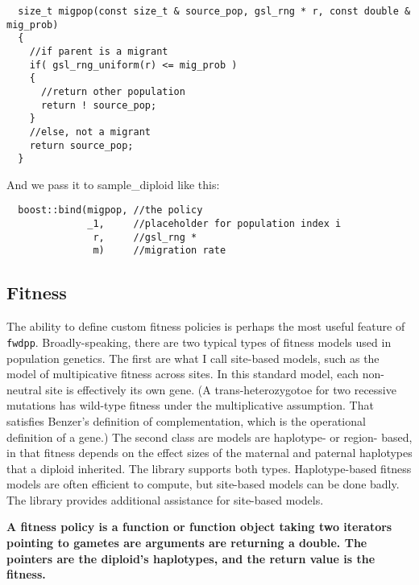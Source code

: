 \documentclass{article}
\begin{document}
\begin{lstlisting}
  size_t migpop(const size_t & source_pop, gsl_rng * r, const double & mig_prob)
  {
    //if parent is a migrant
    if( gsl_rng_uniform(r) <= mig_prob )
    {
      //return other population
      return ! source_pop;
    }
    //else, not a migrant
    return source_pop;
  }
\end{lstlisting}

And we pass it to sample\_diploid like this:
\begin{lstlisting}
  boost::bind(migpop, //the policy
              _1,     //placeholder for population index i
               r,     //gsl_rng *
               m)     //migration rate
\end{lstlisting}
\subsection{Fitness}
The ability to define custom fitness policies is perhaps the most useful feature of \texttt{fwdpp}.  Broadly-speaking, there are two typical types of fitness models used in population genetics.  The first are what I call site-based models, such as the model of multipicative fitness across sites.  In this standard model, each non-neutral site is effectively its own gene. (A trans-heterozygotoe for two recessive mutations has wild-type fitness under the multiplicative assumption. That satisfies Benzer's definition of complementation, which is the operational definition of a gene.)  The second class are models are haplotype- or region- based, in that fitness depends on the effect sizes of the maternal and paternal haplotypes that a diploid inherited.  The library supports both types.  Haplotype-based fitness models are often efficient to compute, but site-based models can be done badly.  The library provides additional assistance for site-based models.

\textbf{A fitness policy is a function or function object taking two iterators pointing to gametes are arguments are returning a double.  The pointers are the diploid's haplotypes, and the return value is the fitness.}
\end{document}

